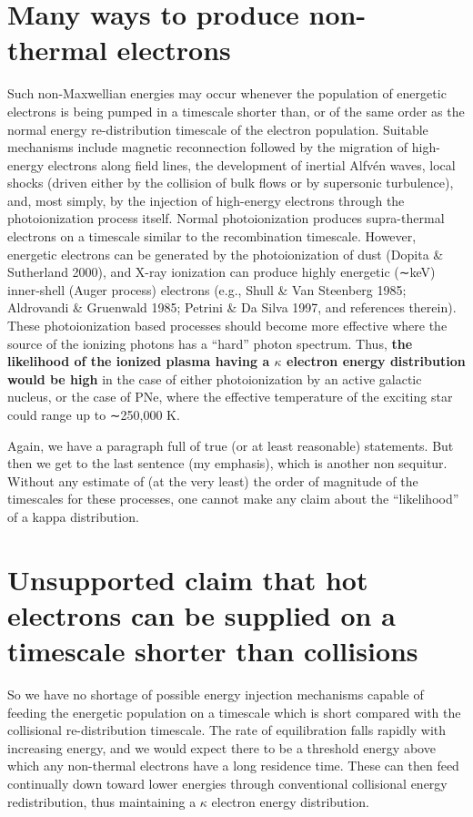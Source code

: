 \documentclass[11pt]{article}
\renewenvironment{quote}{\begin{shaded*}\small\sffamily}{\end{shaded*}}
\begin{document}
\section*{Many ways to produce non-thermal electrons}
\label{sec:orgheadline4}
\begin{quote}
Such non-Maxwellian energies may occur whenever the population of energetic electrons is being pumped in a timescale shorter than, or of the same order as the normal energy re-distribution timescale of the electron population. Suitable mechanisms include magnetic reconnection followed by the migration of high-energy electrons along field lines, the development of inertial Alfvén waves, local shocks (driven either by the collision of bulk flows or by supersonic turbulence), and, most simply, by the injection of high-energy electrons through the photoionization process itself. Normal photoionization produces supra-thermal electrons on a timescale similar to the recombination timescale. However, energetic electrons can be generated by the photoionization of dust (Dopita \& Sutherland 2000), and X-ray ionization can produce highly energetic (∼keV) inner-shell (Auger process) electrons (e.g., Shull \& Van Steenberg 1985; Aldrovandi \& Gruenwald 1985; Petrini \& Da Silva 1997, and references therein). These photoionization based processes should become more effective where the source of the ionizing photons has a “hard” photon spectrum. Thus, \textbf{the likelihood of the ionized plasma having a \(\kappa\) electron energy distribution would be high} in the case of either photoionization by an active galactic nucleus, or the case of PNe, where the effective temperature of the exciting star could range up to ∼250,000 K.
\end{quote}

Again, we have a paragraph full of true (or at least reasonable) statements.  But then we get to the last sentence (my emphasis), which is another non sequitur.  Without any estimate of (at the very least) the order of magnitude of the timescales for these processes, one cannot make any claim about the ``likelihood'' of a kappa distribution. 

\section*{Unsupported claim that hot electrons can be supplied on a timescale shorter than collisions}
\label{sec:orgheadline5}
\begin{quote}
So we have no shortage of possible energy injection mechanisms capable of feeding the energetic population on a timescale which is short compared with the collisional re-distribution timescale. The rate of equilibration falls rapidly with increasing energy, and we would expect there to be a threshold energy above which any non-thermal electrons have a long residence time. These can then feed continually down toward lower energies through conventional collisional energy redistribution, thus maintaining a \(\kappa\) electron energy distribution.
\end{quote}
\end{document}
